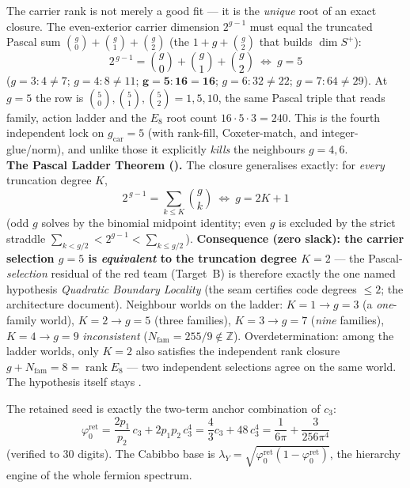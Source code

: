 \documentclass[11pt,a4paper]{article}
\newcommand{\gcar}{g_{\mathrm{car}}}
\newcommand{\cthree}{c_3}
\newcommand{\phiz}{\varphi_0^{\mathrm{ret}}}
\newcommand{\Z}{\mathbb{Z}}
\theoremstyle{definition}
\begin{document}
\begin{keybox}[Pascal closure: $\gcar=5$ is the unique solution (kills alternatives) \mE]
The carrier rank is not merely a good fit --- it is the \emph{unique} root of an exact closure. The
even-exterior carrier dimension $2^{g-1}$ must equal the truncated Pascal sum $\binom g0+\binom g1+\binom g2$
(the $1{+}g{+}\binom g2$ that builds $\dim S^+$):
\[
  \boxed{\ 2^{\,g-1}=\binom g0+\binom g1+\binom g2\ \Longleftrightarrow\ g=5\ }
\]
($g{=}3:4{\ne}7$; $g{=}4:8{\ne}11$; $\mathbf{g{=}5:16{=}16}$; $g{=}6:32{\ne}22$; $g{=}7:64{\ne}29$). At
$g=5$ the row is $\binom50,\binom51,\binom52=1,5,10$, the same Pascal triple that reads family, action
ladder and the $E_8$ root count $16\cdot5\cdot3=240$. This is the fourth independent lock on $\gcar=5$
(with rank-fill, Coxeter-match, and integer-glue/norm), and unlike those it explicitly \emph{kills} the
neighbours $g=4,6$.
\smallskip\\
\noindent\textbf{The Pascal Ladder Theorem ().} The closure generalises
exactly: for \emph{every} truncation degree $K$,
\[
  \boxed{\ 2^{\,g-1}=\textstyle\sum_{k\le K}\binom gk\ \Longleftrightarrow\ g=2K+1\ }
\]
(odd $g$ solves by the binomial midpoint identity; even $g$ is excluded by the strict straddle
$\sum_{k<g/2}<2^{g-1}<\sum_{k\le g/2}$). \textbf{Consequence (zero slack): the carrier selection $g=5$ is
\emph{equivalent} to the truncation degree $K=2$} --- the Pascal-\emph{selection} residual of the red team
(Target~B) is therefore exactly the one named hypothesis \emph{Quadratic Boundary Locality} (the seam
certifies code degrees $\le2$; the architecture document). Neighbour worlds on the ladder: $K{=}1\to g{=}3$ (a
\emph{one}-family world), $K{=}2\to g{=}5$ (three families), $K{=}3\to g{=}7$ (\emph{nine} families),
$K{=}4\to g{=}9$ \emph{inconsistent} ($N_{\mathrm{fam}}=255/9\notin\Z$). Overdetermination: among the
ladder worlds, only $K=2$ also satisfies the independent rank closure $g+N_{\mathrm{fam}}=8=\operatorname{rank}E_8$
--- two independent selections agree on the same world. The hypothesis itself stays \mC.
\end{keybox}

\begin{winbox}
The retained seed is exactly the two-term anchor combination of $\cthree$:
\[
  \boxed{\ \phiz=\frac{2p_1}{p_2}\,\cthree+2p_1p_2\,\cthree^4=\frac43\cthree+48\,\cthree^4
  =\frac1{6\pi}+\frac{3}{256\pi^4}\ }
\]
(verified to $30$ digits). The Cabibbo base is $\lambda_Y=\sqrt{\phiz(1-\phiz)}$, the hierarchy engine
of the whole fermion spectrum. \mE
\end{winbox}
\end{document}
